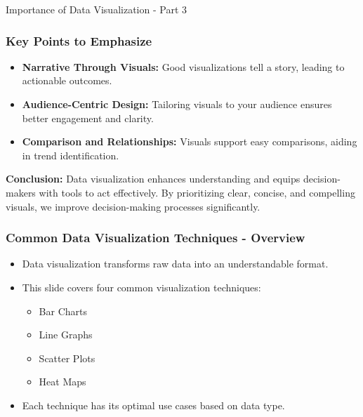 \documentclass[aspectratio=169]{beamer}
\begin{document}
\begin{frame}[fragile]{Importance of Data Visualization - Part 3}
    \frametitle{Key Points to Emphasize}
    \begin{itemize}
        \item \textbf{Narrative Through Visuals:} Good visualizations tell a story, leading to actionable outcomes.
        \item \textbf{Audience-Centric Design:} Tailoring visuals to your audience ensures better engagement and clarity.
        \item \textbf{Comparison and Relationships:} Visuals support easy comparisons, aiding in trend identification.
    \end{itemize}

    \textbf{Conclusion:} Data visualization enhances understanding and equips decision-makers with tools to act effectively. By prioritizing clear, concise, and compelling visuals, we improve decision-making processes significantly.
\end{frame}

\begin{frame}[fragile]
    \frametitle{Common Data Visualization Techniques - Overview}
    \begin{itemize}
        \item Data visualization transforms raw data into an understandable format.
        \item This slide covers four common visualization techniques:
        \begin{itemize}
            \item Bar Charts
            \item Line Graphs
            \item Scatter Plots
            \item Heat Maps
        \end{itemize}
        \item Each technique has its optimal use cases based on data type.
    \end{itemize}
\end{frame}
\end{document}
